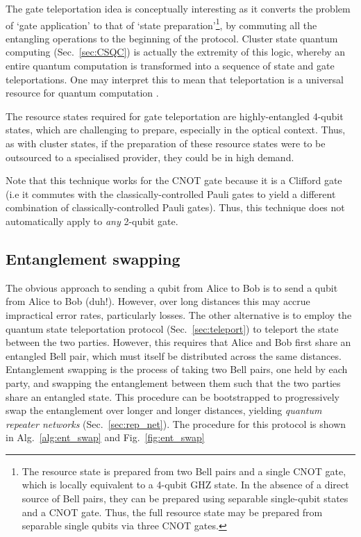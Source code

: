 The gate teleportation idea is conceptually interesting as it converts the problem of `gate application' to that of `state preparation'\footnote{The resource state is prepared from two Bell pairs and a single CNOT gate, which is locally equivalent to a 4-qubit GHZ state. In the absence of a direct source of Bell pairs, they can be prepared using separable single-qubit states and a CNOT gate. Thus, the full resource state may be prepared from separable single qubits via three CNOT gates.}, by commuting all the entangling operations to the beginning of the protocol. Cluster state quantum computing (Sec.~\ref{sec:CSQC}) is actually the extremity of this logic, whereby an entire quantum computation is transformed into a sequence of state and gate teleportations. One may interpret this to mean that teleportation is a universal resource for quantum computation \cite{bib:GottesmanChuang99}.

The resource states required for gate teleportation are highly-entangled 4-qubit states, which are challenging to prepare, especially in the optical context. Thus, as with cluster states, if the preparation of these resource states were to be outsourced to a specialised provider, they could be in high demand.

Note that this technique works for the CNOT gate because it is a Clifford gate (i.e it commutes with the classically-controlled Pauli gates to yield a different combination of classically-controlled Pauli gates). Thus, this technique does not automatically apply to \textit{any} 2-qubit gate.

%
%

\subsection{Entanglement swapping} \label{sec:swapping} 

The obvious approach to sending a qubit from Alice to Bob is to send a qubit from Alice to Bob (duh!). However, over long distances this may accrue impractical error rates, particularly losses. The other alternative is to employ the quantum state teleportation protocol (Sec.~\ref{sec:teleport}) to teleport the state between the two parties. However, this requires that Alice and Bob first share an entangled Bell pair, which must itself be distributed across the same distances. Entanglement swapping \cite{???, bib:PhysRevLett.75.4337} is the process of taking two Bell pairs, one held by each party, and swapping the entanglement between them such that the two parties share an entangled state. This procedure can be bootstrapped to progressively swap the entanglement over longer and longer distances, yielding \textit{quantum repeater networks} (Sec.~\ref{sec:rep_net}). The procedure for this protocol is shown in Alg.~\ref{alg:ent_swap} and Fig.~\ref{fig:ent_swap}

